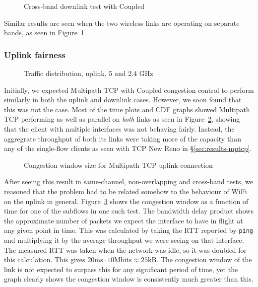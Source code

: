 \begin{figure}[h]
 \centering
 
 \caption{Cross-band downlink test with Coupled}\label{graph:cb-fairness-down}
\end{figure}

Similar results are seen when the two wireless links are operating on separate
bands, as seen in Figure~\ref{graph:cb-fairness-down}.

\subsubsection{Uplink fairness}

\begin{figure}[h]
 \centering
 
 \caption{Traffic distribution, uplink, 5 and 2.4 GHz}\label{graph:up-fair}
\end{figure}

Initially, we expected Multipath TCP with Coupled congestion control to perform
similarly in both the uplink and downlink cases. However, we soon found
that this was not the case. Most of the time plots and CDF graphs showed 
Multipath TCP performing as well as parallel on \emph{both} links as seen in
Figure~\ref{graph:up-fair}, showing that the client with multiple interfaces was
not behaving fairly. Instead, the aggregrate throughput of both its links were taking more of the capacity than any of the single-flow clients as seen with TCP New Reno in \S\ref{sec:results-mptcp}.

\begin{figure}[h]
 \centering
 
 \caption{Congestion window size for Multipath TCP uplink connection}\label{graph:fairness-up-close}
\end{figure}

After seeing this result in same-channel, non-overlapping and cross-band  
tests, we reasoned that the problem had to be related somehow to the 
behaviour of WiFi on the uplink in general. Figure~\ref{graph:fairness-up-close} 
shows the congestion window as a function of time for one of the subflows in one 
such test. The bandwidth delay product shows the approximate number of packets
we expect the interface to have in flight at any given point in time. This was
calculated by taking the RTT reported by \texttt{ping} and multiplying it by the
average throughput we were seeing on that interface. The measured RTT was taken
when the network was idle, so it was doubled for this calculation. This gives
$20\text{ms} \cdot 10\text{Mbits} \approx 25\text{kB}$. The congestion window of
the link is not expected to surpass this for any significant period of time, yet
the graph clearly shows the congestion window is consistently much greater than
this.

